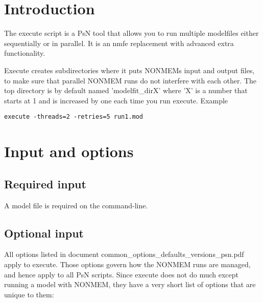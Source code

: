 




\maketitle
\newcommand{\guidetoolname}{execute}


\section{Introduction}
The execute script is a PsN tool that allows you to run multiple modelfiles either sequentially or in parallel. It is an nmfe replacement with advanced extra
functionality.

Execute creates subdirectories where it puts NONMEMs input and output files, to make sure that parallel NONMEM runs do not interfere with each other.
The top directory is by default named 'modelfit\_dirX' where 'X' is a number that starts at 1 and is increased by one each time you run execute.
Example
\begin{verbatim}
execute -threads=2 -retries=5 run1.mod 
\end{verbatim}


\section{Input and options}
\subsection{Required input}
A model file is required on the command-line. 

\subsection{Optional input}
All options listed in document common\_options\_defaults\_versions\_psn.pdf apply to execute. 
Those options govern how the NONMEM runs are managed, and hence apply to all PsN scripts.
Since execute does not do much except running a model with NONMEM, 
they have a very short list of options that are unique to them:

